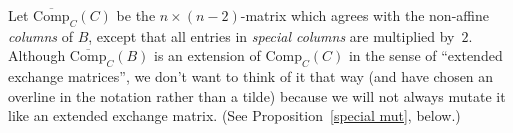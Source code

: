 \documentclass[10pt]{article}
\newtheorem{proposition}{Proposition}[section]
\theoremstyle{definition}
\theoremstyle{remark}
\numberwithin{equation}{section}
\newcommand{\0}{{\mathbf{0}}}
\newcommand{\Comp}{\mathrm{Comp}_C}
\newcommand{\CompPlus}{\overline{\mathrm{Comp}}_C}
\begin{document}
Let $\CompPlus(C)$ be the $n\times(n-2)$-matrix which agrees with the non-affine \emph{columns} of $B$, except that all entries in \emph{special columns} are multiplied by~$2$.
Although $\CompPlus(B)$ is an extension of $\Comp(C)$ in the sense of ``extended exchange matrices'', we don't want to think of it that way (and have chosen an overline in the notation rather than a tilde) because we will not always mutate it like an extended exchange matrix.
(See Proposition~\ref{special mut}, below.)

\end{document}
